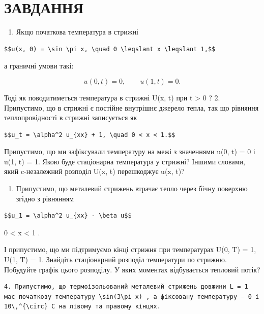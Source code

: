 \documentclass[
  ukrainian,
]{article}
\providecommand{\tightlist}{%
  \setlength{\itemsep}{0pt}\setlength{\parskip}{0pt}}
\begin{document}
\section{ЗАВДАННЯ}\label{ux437ux430ux432ux434ux430ux43dux43dux44f-1}

\begin{enumerate}
\def\labelenumi{\arabic{enumi}.}
\tightlist
\item
  Якщо початкова температура в стрижні
\end{enumerate}

\begin{verbatim}
$$u(x, 0) = \sin \pi x, \quad 0 \leqslant x \leqslant 1,$$
\end{verbatim}

а граничні умови такі:

\[
u(0, t) = 0, \qquad u(1, t) = 0.
\]

Тоді як поводитиметься температура в стрижні U(x, t) при t
\textgreater{} 0 ? 2. Припустимо, що в стрижні є постійне внутрішнє
джерело тепла, так що рівняння теплопровідності в стрижні записується як

\begin{verbatim}
$$u_t = \alpha^2 u_{xx} + 1, \quad 0 < x < 1.$$
\end{verbatim}

Припустимо, що ми зафіксували температуру на межі з значеннями u(0, t) =
0 і u(1, t) = 1. Якою буде стаціонарна температура у стрижні? Іншими
словами, який c-незалежний розподіл U(x, t) перешкоджує u(x, t)?

\begin{enumerate}
\def\labelenumi{\arabic{enumi}.}
\setcounter{enumi}{2}
\tightlist
\item
  Припустимо, що металевий стрижень втрачає тепло через бічну поверхню
  згідно з рівнянням
\end{enumerate}

\begin{verbatim}
$$u_1 = \alpha^2 u_{xx} - \beta u$$
\end{verbatim}

0 \textless{} x \textless{} 1 .

І припустимо, що ми підтримуємо кінці стрижня при температурах U(0, T) =
1, U(1, T) = 1. Знайдіть стаціонарний розподіл температури по стрижню.
Побудуйте графік цього розподілу. У яких моментах відбувається тепловий
потік?

\begin{verbatim}
4. Припустимо, що термоізольований металевий стрижень довжини L = 1 має початкову температуру \sin(3\pi x) , а фіксовану температуру — 0 і 10\,^{\circ} C на лівому та правому кінцях.
\end{verbatim}
\end{document}
